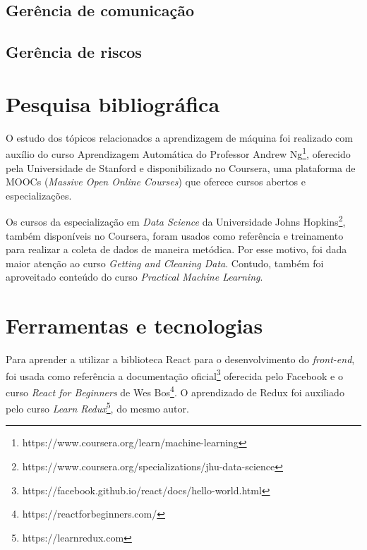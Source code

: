
\subsection{Gerência de comunicação}


\subsection{Gerência de riscos}

\section{Pesquisa bibliográfica}

O estudo dos tópicos relacionados a aprendizagem de máquina foi realizado com auxílio do curso Aprendizagem Automática do Professor Andrew Ng\footnote{ https://www.coursera.org/learn/machine-learning}, oferecido pela Universidade de Stanford e disponibilizado no Coursera, uma plataforma de MOOCs (\textit{Massive Open Online Courses}) que oferece cursos abertos e especializações.

Os cursos da especialização em \textit{Data Science} da Universidade Johns Hopkins\footnote{ https://www.coursera.org/specializations/jhu-data-science}, também disponíveis no Coursera, foram usados como referência e treinamento para realizar a coleta de dados de maneira metódica. Por esse motivo, foi dada maior atenção ao curso \textit{Getting and Cleaning Data}. Contudo, também foi aproveitado conteúdo do curso \textit{Practical Machine Learning}.

\section{Ferramentas e tecnologias}

Para aprender a utilizar a biblioteca React para o desenvolvimento do \emph{front-end}, foi usada como referência a documentação oficial\footnote{https://facebook.github.io/react/docs/hello-world.html} oferecida pelo Facebook e o curso \textit{React for Beginners} de Wes Bos\footnote{ https://reactforbeginners.com/}. O aprendizado de Redux foi auxiliado pelo curso \textit{Learn Redux}\footnote{https://learnredux.com}, do mesmo autor.
